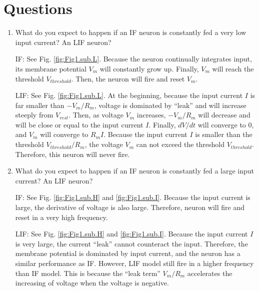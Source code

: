 \documentclass[11pt]{article}
\begin{document}
	\section*{Questions}
	\begin{enumerate}
		\item What do you expect to happen if an IF neuron is constantly fed a very low input current? An LIF neuron?
		
		IF: See Fig. \ref{fig:Fig1.sub.L}. Because the neuron continually integrates input, its membrane potential $V_m$ will constantly grow up. Finally, $V_m$ will reach the threshold $V_{threshold}$. Then, the neuron will fire and reset $V_m$.
		
		LIF: See Fig. \ref{fig:Fig1.sub.L}. At the beginning, because the input current $I$ is far smaller than $-V_m/R_m$, voltage is dominated by ``leak'' and will increase steeply from $V_{rest}$. Then, as voltage $V_m$ increases, $-V_m/R_m$ will decrease and will be close or equal to the input current $I$. Finally, $dV/dt$ will converge to 0, and $V_m$ will converge to $R_m I$. Because the input current $I$ is smaller than the threshold $V_{threshold}/R_m$, the voltage $V_m$ can not exceed the threshold $V_{threshold}$. Therefore, this neuron will never fire.
		
		\item What do you expect to happen if an IF neuron is constantly fed a large input current? An LIF neuron?
			
		IF: See Fig. \ref{fig:Fig1.sub.H} and \ref{fig:Fig1.sub.I}. Because the input current is large, the derivative of voltage is also large. Therefore, neuron will fire and reset in a very high frequency.
		
		LIF: See Fig. \ref{fig:Fig1.sub.H} and \ref{fig:Fig1.sub.I}. Because the input current $I$ is very large, the current ``leak'' cannot counteract the input. Therefore, the membrane potential is dominated by input current, and the neuron has a similar performance as IF. However, LIF model still fire in a higher frequency than IF model. This is because the ``leak term'' $V_m/R_m$ accelerates the increasing of voltage when the voltage is negative.
				

\end{enumerate}
\end{document}
